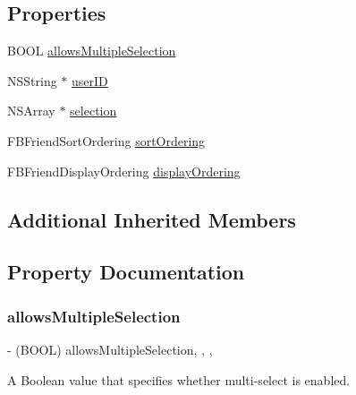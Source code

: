 \subsection*{Properties}
\begin{DoxyCompactItemize}
\item 
B\+O\+OL \hyperlink{interfaceFBPeoplePickerViewController_a03397b16de0ad8bb70ac44f0fe9535ec}{allows\+Multiple\+Selection}
\item 
N\+S\+String $\ast$ \hyperlink{interfaceFBPeoplePickerViewController_a860353514f11019f94b6b9f8f3135f52}{user\+ID}
\item 
N\+S\+Array $\ast$ \hyperlink{interfaceFBPeoplePickerViewController_ae03d61370b41de5746a8ce931ffa5f60}{selection}
\item 
F\+B\+Friend\+Sort\+Ordering \hyperlink{interfaceFBPeoplePickerViewController_a69d1daf99535c33b2922704b3eb51c72}{sort\+Ordering}
\item 
F\+B\+Friend\+Display\+Ordering \hyperlink{interfaceFBPeoplePickerViewController_afe5e2ac4e66281c70db1f7ca1ceb0ae1}{display\+Ordering}
\end{DoxyCompactItemize}
\subsection*{Additional Inherited Members}


\subsection{Property Documentation}
\mbox{\label{interfaceFBPeoplePickerViewController_a03397b16de0ad8bb70ac44f0fe9535ec}} 
\subsubsection{\texorpdfstring{allows\+Multiple\+Selection}{allowsMultipleSelection}}
{\footnotesize\ttfamily -\/ (B\+O\+OL) allows\+Multiple\+Selection\hspace{0.3cm}{\ttfamily [read]}, {\ttfamily [write]}, {\ttfamily [nonatomic]}, {\ttfamily [assign]}}

A Boolean value that specifies whether multi-\/select is enabled. \mbox{\label{interfaceFBPeoplePickerViewController_afe5e2ac4e66281c70db1f7ca1ceb0ae1}} 

